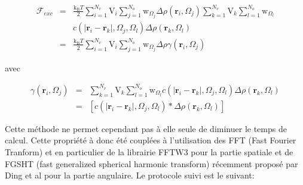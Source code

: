 \begin{eqnarray}
\mathcal{F}_{exc}&=&\frac{\mathrm{k_B}T}{2}\sum\limits_{i=1}^{N_v}\mathrm{V}_i\sum\limits_{j=1}^{N_o}\mathrm{w}_{\Omega_j} \Delta\rho\left(\boldsymbol{r}_i,\Omega_j\right) \sum\limits_{k=1}^{N_v}\mathrm{V}_k\sum\limits_{l=1}^{N_o} \mathrm{w}_{\Omega_l} \\
                & & c\left( \left|\boldsymbol{r}_i-\boldsymbol{r}_k\right|,\Omega_j,\Omega_l \right) \Delta\rho\left(\boldsymbol{r}_k,\Omega_l\right) \nonumber \\
				 &=&\frac{\mathrm{k_B}T}{2}\sum\limits_{i=1}^{N_v}\mathrm{V}_i\sum\limits_{j=1}^{N_o}\mathrm{w}_{\Omega_j} \Delta\rho \gamma \left(\boldsymbol{r}_i,\Omega_j\right)
\end{eqnarray}

avec

\begin{eqnarray}
\gamma\left(\boldsymbol{r}_i,\Omega_j\right) &=& \sum\limits_{k=1}^{N_v}\mathrm{V}_k\sum\limits_{l=1}^{N_o} \mathrm{w}_{\Omega_l}c\left( \left|\boldsymbol{r}_i-\boldsymbol{r}_k\right|,\Omega_j,\Omega_l \right) \Delta\rho\left(\boldsymbol{r}_k,\Omega_l\right) \\
&=& [ c\left( \left|\boldsymbol{r}_i-\boldsymbol{r}_k\right|,\Omega_j,\Omega_l \right) * \Delta\rho\left(\boldsymbol{r}_k,\Omega_l\right) ]
\end{eqnarray}


Cette méthode ne permet cependant pas à elle seule de diminuer le temps de calcul. Cette propriété à donc été couplées à l'utilisation des FFT (Fast Fourier Tranform) et en particulier de la librairie FFTW3 pour la partie spatiale et de FGSHT (fast generalized spherical harmonic transform) récemment proposé par Ding et al\cite{ding_thesis} pour la partie angulaire. Le protocole suivi est le suivant:

